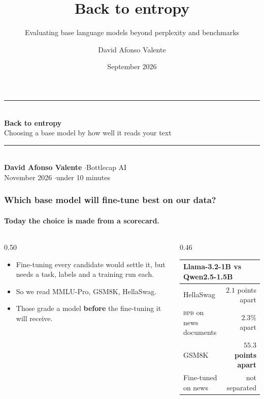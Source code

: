 \documentclass[aspectratio=169,11pt]{beamer}
\title{\textbf{Back to entropy}}
\subtitle{Evaluating base language models beyond perplexity and benchmarks}
\author{David Afonso Valente}
\institute{Bottlecap AI}
\date{September 2026}
\newcommand{\bpb}{\textsc{bpb}}
\newcommand{\keyw}[1]{\textcolor{accent}{\textbf{#1}}}
\newcommand{\warmw}[1]{\textcolor{warm}{\textbf{#1}}}
\begin{document}
{
\begin{frame}[plain]
  \vspace{1.2em}
  {\color{rule}\rule{\textwidth}{0.8pt}}\\[1.1em]
  {\LARGE\bfseries Back to entropy}\\[0.55em]
  {\large\color{mute} Choosing a base model by how well it reads your text}\\[1.1em]
  {\color{rule}\rule{\textwidth}{0.8pt}}\\[1.4em]
  {\small\textbf{David Afonso Valente} \quad\textcolor{mute}{$\cdot$}\quad Bottlecap AI}\\[0.3em]
  {\small\color{mute} November 2026 \quad$\cdot$\quad under 10 minutes}
\end{frame}
}

\begin{frame}
  \frametitle{Which base model will fine-tune best on our data?}
  \framesubtitle{Today the choice is made from a scorecard.}

  \vspace{0.8em}
  \begin{columns}[c]
  \begin{column}{0.50\textwidth}
    \begin{itemize}\setlength\itemsep{0.7em}
      \item Fine-tuning every candidate would settle it, but needs a task, labels and a training run each.
      \item So we read MMLU-Pro, GSM8K, HellaSwag.
      \item Those grade a model \keyw{before} the fine-tuning it will receive.
    \end{itemize}
  \end{column}
  \begin{column}{0.46\textwidth}
    \centering\small
    \renewcommand{\arraystretch}{1.25}
    \begin{tabular}{lr}
      \toprule
      \multicolumn{2}{l}{\textbf{Llama-3.2-1B} vs \textbf{Qwen2.5-1.5B}} \\
      \midrule
      HellaSwag & $2.1$ points apart \\
      \bpb{} on news documents & $2.3\%$ apart \\
      GSM8K & \warmw{$55.3$ points apart} \\
      Fine-tuned on news & not separated \\
      \bottomrule
    \end{tabular}
  \end{column}
  \end{columns}
\end{frame}
\end{document}
